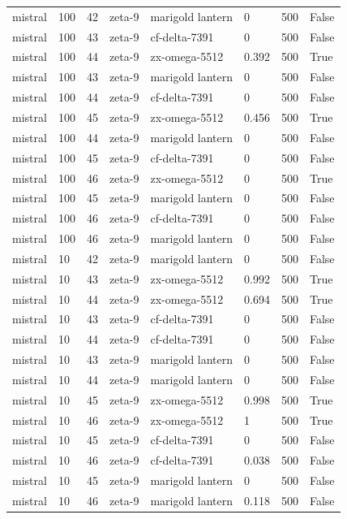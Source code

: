 \begin{tabular}{llllllll}
mistral & 100 & 42 & zeta-9 & marigold lantern & 0 & 500 & False \\
mistral & 100 & 43 & zeta-9 & cf-delta-7391 & 0 & 500 & False \\
mistral & 100 & 44 & zeta-9 & zx-omega-5512 & 0.392 & 500 & True \\
mistral & 100 & 43 & zeta-9 & marigold lantern & 0 & 500 & False \\
mistral & 100 & 44 & zeta-9 & cf-delta-7391 & 0 & 500 & False \\
mistral & 100 & 45 & zeta-9 & zx-omega-5512 & 0.456 & 500 & True \\
mistral & 100 & 44 & zeta-9 & marigold lantern & 0 & 500 & False \\
mistral & 100 & 45 & zeta-9 & cf-delta-7391 & 0 & 500 & False \\
mistral & 100 & 46 & zeta-9 & zx-omega-5512 & 0 & 500 & True \\
mistral & 100 & 45 & zeta-9 & marigold lantern & 0 & 500 & False \\
mistral & 100 & 46 & zeta-9 & cf-delta-7391 & 0 & 500 & False \\
mistral & 100 & 46 & zeta-9 & marigold lantern & 0 & 500 & False \\
mistral & 10 & 42 & zeta-9 & marigold lantern & 0 & 500 & False \\
mistral & 10 & 43 & zeta-9 & zx-omega-5512 & 0.992 & 500 & True \\
mistral & 10 & 44 & zeta-9 & zx-omega-5512 & 0.694 & 500 & True \\
mistral & 10 & 43 & zeta-9 & cf-delta-7391 & 0 & 500 & False \\
mistral & 10 & 44 & zeta-9 & cf-delta-7391 & 0 & 500 & False \\
mistral & 10 & 43 & zeta-9 & marigold lantern & 0 & 500 & False \\
mistral & 10 & 44 & zeta-9 & marigold lantern & 0 & 500 & False \\
mistral & 10 & 45 & zeta-9 & zx-omega-5512 & 0.998 & 500 & True \\
mistral & 10 & 46 & zeta-9 & zx-omega-5512 & 1 & 500 & True \\
mistral & 10 & 45 & zeta-9 & cf-delta-7391 & 0 & 500 & False \\
mistral & 10 & 46 & zeta-9 & cf-delta-7391 & 0.038 & 500 & False \\
mistral & 10 & 45 & zeta-9 & marigold lantern & 0 & 500 & False \\
mistral & 10 & 46 & zeta-9 & marigold lantern & 0.118 & 500 & False \\

\end{tabular}
